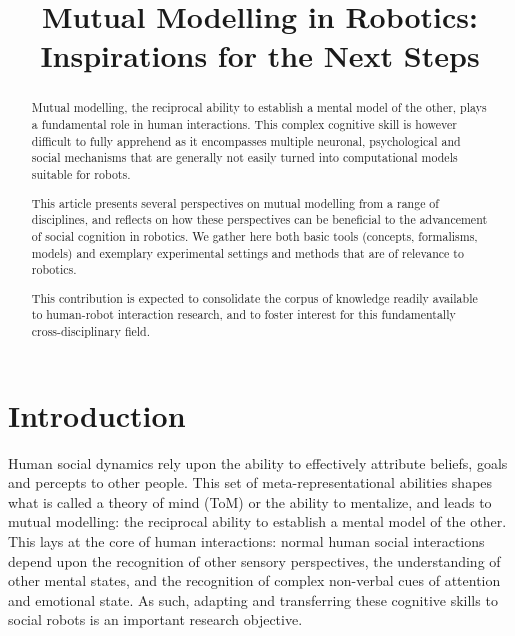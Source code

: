 \documentclass{sig-alternate}
\title{\LARGE \bf
Mutual Modelling in Robotics: \\Inspirations for the Next Steps
}
\begin{document}
\sloppy
\maketitle

\begin{abstract}

Mutual modelling, the reciprocal ability to establish a mental model of the
other, plays a fundamental role in human interactions. This complex cognitive
skill is however difficult to fully apprehend as it encompasses multiple
neuronal, psychological and social mechanisms that are generally not easily
turned into computational models suitable for robots.

This article presents several perspectives on mutual modelling from a range of
disciplines, and reflects on how these perspectives can be beneficial to the
advancement of social cognition in robotics. We gather here both basic tools
(concepts, formalisms, models) and exemplary experimental settings and methods
that are of relevance to robotics.

This contribution is expected to consolidate the corpus of knowledge readily
available to human-robot interaction research, and to foster interest for this
fundamentally cross-disciplinary field.

\end{abstract}


\section{Introduction}

Human social dynamics rely upon the ability to effectively attribute beliefs,
goals and percepts to other people. This set of meta-representational abilities
shapes what is called a theory of mind (ToM) or the ability to mentalize, and
leads to mutual modelling: the reciprocal ability to establish a mental model of
the other. This lays at the core of human interactions: normal human social
interactions depend upon the recognition of other sensory perspectives, the
understanding of other mental states, and the recognition of complex non-verbal
cues of attention and emotional state. As such, adapting and transferring these
cognitive skills to social robots is an important research objective.
\end{document}
